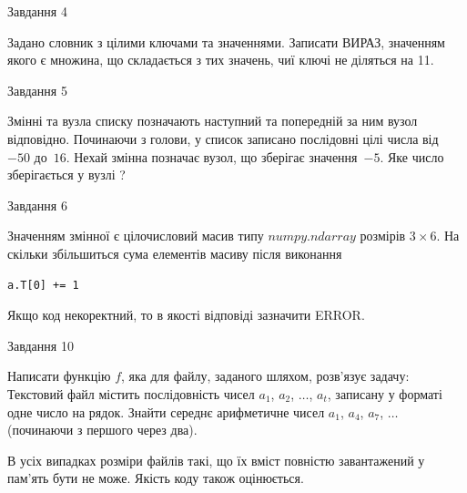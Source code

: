 \documentclass[12pt, ukrainian]{article}
\begin{document}
{               
{\begin{center}Завдання {4}\end{center}}
\vspace{-6mm}
Задано словник  з цілими ключами та значеннями. Записати ВИРАЗ, значенням якого є множина, що складається  з тих значень, чиї ключі не діляться на 11.\par

\vspace{10mm}
               
{\begin{center}Завдання {5}\end{center}}
\vspace{-6mm}
Змінні  та  вузла списку позначають наступний та попередній за ним вузол відповідно. Починаючи з голови, у список записано послідовні цілі числа від~$-50$ до~$16$. Нехай змінна  позначає вузол, що зберігає значення~$-5$.
Яке число зберігається у вузлі  ?\par

               
{\begin{center}Завдання {6}\end{center}}
\vspace{-6mm}
Значенням змінної  є цілочисловий масив типу $numpy.ndarray$ розмірів $3{\times}6$. На скільки збільшиться сума елементів масиву  після виконання
\begin{verbatim}
a.T[0] += 1
\end{verbatim}


Якщо код некоректний, то в якості відповіді зазначити ERROR.\par

               
{\begin{center}Завдання {10}\end{center}}
\vspace{-6mm}

Написати функцію $f$, яка для файлу, заданого шляхом, розв’язує задачу:\\ Текстовий файл містить послідовність чисел $a_1$, $a_2$, $\ldots$, $a_t$, записану у форматі одне число на рядок. Знайти середнє арифметичне чисел $a_1$, $a_4$, $a_7$, $\ldots$ (починаючи з першого через два).

В усіх випадках розміри файлів такі, що їх вміст повністю завантажений у пам'ять бути не може. Якість коду також оцінюється.



\vspace{10mm}\par

}
\end{document}
